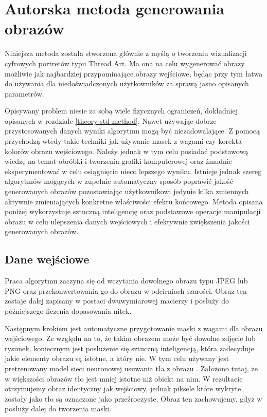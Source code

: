 \documentclass[a4paper, 12pt, polish, twoside]{extreport}
\begin{document}
        
\chapter{Autorska metoda generowania obrazów} \label{mine}
Niniejsza metoda została stworzona głównie z myślą o tworzeniu wizualizacji cyfrowych portretów typu Thread Art. Ma ona na celu wygenerować obrazy możliwie jak najbardziej przypominające obrazy wejściowe, będąc przy tym łatwa do używania dla niedoświadczonych użytkowników za sprawą jasno opisanych parametrów. 

Opisywany problem niesie za sobą wiele fizycznych ograniczeń, dokładniej opisanych w rozdziale \ref{theory-std-method}. Nawet używając dobrze przystosowanych danych wyniki algorytmu mogą być niezadowalające. Z pomocą przychodzą wtedy takie techniki jak używanie masek z wagami czy korekta kolorów obrazu wejściowego. Należy jednak w tym celu posiadać podstawową wiedzę na temat obróbki i tworzenia grafiki komputerowej oraz żmudnie eksperymentować w celu osiągnięcia nieco lepszego wyniku. Istnieje jednak szereg algorytmów mogących w zupełnie automatyczny sposób poprawić jakość generowanych obrazów pozostawiając użytkownikowi jedynie kilka zmiennych aktywnie zmieniających konkretne właściwości efektu końcowego. Metoda opisana poniżej wykorzystuje sztuczną inteligencję oraz podstawowe operacje manipulacji obrazu w celu ulepszenia danych wejściowych i efektywnie zwiększenia jakości generowanych obrazów.

    \section{Dane wejściowe} \label{mine-input}
    Praca algorytmu zaczyna się od wczytania dowolnego obrazu typu JPEG lub PNG oraz przekonwertowania go do obrazu w odcieniach szarości. Obraz ten zostaje dalej zapisany w postaci dwuwymiarowej macierzy i posłuży do późniejszego liczenia dopasowania nitek.
    
    Następnym krokiem jest automatyczne przygotowanie maski z wagami dla obrazu wejściowego. Ze względu na to, że takim obrazem może być dowolne zdjęcie lub rysunek, koniecznym jest posłużenie się sztuczną inteligencją, która zadecyduje jakie elementy obrazu są istotne, a który nie. W tym celu używany jest pretrenowany model sieci neuronowej usuwania tła z obrazu \cite{rembg}. Założono tutaj, że w większości obrazów tło jest mniej istotne niż obiekt na nim. W rezultacie otrzymujemy obraz identyczny jak wejściowy, jednak piksele które wykryte zostały jako tło są oznaczone jako przeźroczyste. Obraz ten zachowujemy, gdyż w posłuży dalej do tworzenia maski.
    
\end{document}
